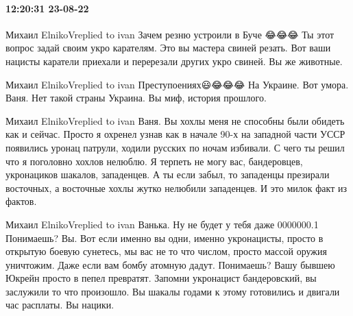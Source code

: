  
 
 
 
 

\paragraph{12:20:31 23-08-22}

Михаил ElnikoVreplied to ivan
Зачем резню устроили в Буче 😂😂😂
Ты этот вопрос задай своим укро карателям. Это вы мастера свиней резать.
Вот ваши нацисты каратели приехали и перерезали других укро свиней. Вы же животные.

Михаил ElnikoVreplied to ivan
Преступоениях😃😂😂😂 На Украине.
Вот умора.
Ваня. Нет такой страны Украина. Вы миф, история прошлого.

Михаил ElnikoVreplied to ivan
Ваня. Вы хохлы меня не способны были обидеть как и сейчас. Просто я охренел узнав как в начале 90-х на западной части УССР появились уронац патрули, ходили русских по ночам избивали.
С чего ты решил что я поголовно хохлов нелюблю.
Я терпеть не могу вас, бандеровцев, укронациков шакалов, западенцев. А ты если забыл, то западенцы презирали восточных, а восточные хохлы жутко нелюбили западенцев.
И это милок факт из фактов.

Михаил ElnikoVreplied to ivan
Ванька. Ну не будет у тебя даже 0000000.1 %
Понимаешь? Вы. Вот если именно вы одни, именно укронацисты, просто в открытую боевую сунетесь, мы вас не то что числом, просто массой оружия уничтожим. Даже если вам бомбу атомную дадут. Понимаешь? Вашу бывшею Юкрейн просто в пепел превратят.
Запомни укронацист бандеровский, вы заслужили то что произошло. Вы шакалы годами к этому готовились и двигали час расплаты.
Вы нацики.
